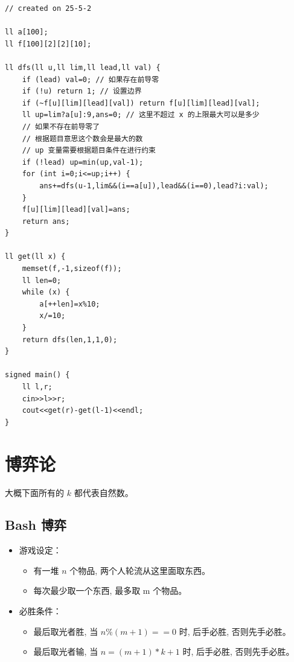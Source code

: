 \documentclass[a4paper,12pt]{article}
\begin{document}
\begin{lstlisting}
// created on 25-5-2

ll a[100];
ll f[100][2][2][10];

ll dfs(ll u,ll lim,ll lead,ll val) {
    if (lead) val=0; // 如果存在前导零
    if (!u) return 1; // 设置边界
    if (~f[u][lim][lead][val]) return f[u][lim][lead][val];
    ll up=lim?a[u]:9,ans=0; // 这里不超过 x 的上限最大可以是多少
    // 如果不存在前导零了
    // 根据题目意思这个数会是最大的数 
    // up 变量需要根据题目条件在进行约束
    if (!lead) up=min(up,val-1);
    for (int i=0;i<=up;i++) {
        ans+=dfs(u-1,lim&&(i==a[u]),lead&&(i==0),lead?i:val); 
    }
    f[u][lim][lead][val]=ans;
    return ans;
}

ll get(ll x) {
    memset(f,-1,sizeof(f));
    ll len=0;
    while (x) {
        a[++len]=x%10;
        x/=10;
    }
    return dfs(len,1,1,0);
}

signed main() {
    ll l,r;
    cin>>l>>r;
    cout<<get(r)-get(l-1)<<endl;	
}    
\end{lstlisting}

\newpage

\section{博弈论}

\noindent 大概下面所有的 $k$ 都代表自然数。

\subsection{Bash 博弈}

\begin{itemize}
    \item 游戏设定：
    \begin{itemize}
        \item 有一堆 $n$ 个物品, 两个人轮流从这里面取东西。
        \item 每次最少取一个东西, 最多取 m 个物品。
    \end{itemize}
    
    \item 必胜条件：
    \begin{itemize}
        \item 最后取光者胜, 当 $n \% (m + 1) == 0$ 时, 后手必胜, 否则先手必胜。
        \item 最后取光者输, 当 $n = (m + 1) * k + 1$ 时, 后手必胜, 否则先手必胜。
    \end{itemize}
\end{itemize}
\end{document}
